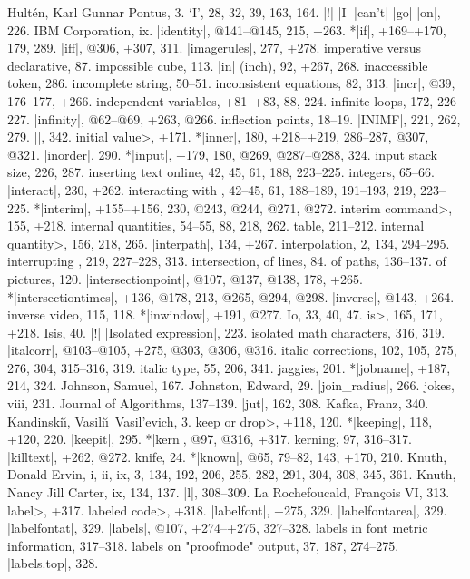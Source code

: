 Hult\'en, Karl Gunnar Pontus, 3.
\newletter
`I', 28, 32, 39, 163, 164.
|!| |I| |can't| |go| |on|, 226.
IBM Corporation, ix.
|identity|, @141--@145, 215, +263.
*|if|, +169--+170, 179, 289.
|iff|, @306, +307, 311.
|imagerules|, 277, +278.
imperative versus declarative, 87.
impossible cube, 113.
|in| (inch), 92, +267, 268.
inaccessible token, 286.
incomplete string, 50--51.
inconsistent equations, 82, 313.
|incr|, @39, 176--177, +266.
independent variables, +81--+83, 88, 224.
infinite loops, 172, 226--227.
|infinity|, @62--@69, +263, @266.
inflection points, 18--19.
|INIMF|, 221, 262, 279.
|\init|, 342.
\<initial value>, +171.
*|inner|, 180, +218--+219, 286--287, @307, @321.
|inorder|, 290.
*|input|, +179, 180, @269, @287--@288, 324.
input stack size, 226, 287.
inserting text online, 42, 45, 61, 188, 223--225.
integers, 65--66.
|interact|, 230, +262.
interacting with \MF, 42--45, 61, 188--189, 191--193, 219, 223--225.
*|interim|, +155--+156, 230, @243, @244, @271, @272.
\<interim command>, 155, +218.
internal quantities, 54--55, 88, 218, 262.
\sub table, 211--212.
\<internal quantity>, 156, 218, 265.
|interpath|, 134, +267.
interpolation, 2, 134, 294--295.
interrupting \MF, 219, 227--228, 313.
intersection, of lines, 84.
\sub of paths, 136--137.
\sub of pictures, 120.
|intersectionpoint|, @107, @137, @138, 178, +265.
*|intersectiontimes|, +136, @178, 213, @265, @294, @298.
|inverse|, @143, +264.
inverse video, 115, 118.
*|inwindow|, +191, @277.
Io, 33, 40, 47.
\<is>, 165, 171, +218.
Isis, 40.
|!| |Isolated expression|, 223.
isolated math characters, 316, 319.
|italcorr|, @103--@105, +275, @303, @306, @316.
italic corrections, 102, 105, 275, 276, 304, 315--316, 319.
italic type, 55, 206, 341.
\newletter
jaggies, 201.
*|jobname|, +187, 214, 324.
Johnson, Samuel, 167.
Johnston, Edward, 29.
|join_radius|, 266.
jokes, viii, 231.
Journal of Algorithms, 137--139.
|jut|, 162, 308.
\newletter
Kafka, Franz, 340.
Kandinski\u\i, Vasili\u\i\ Vasil'evich, 3.
\<keep or drop>, +118, 120.
*|keeping|, 118, +120, 220.
|keepit|, 295.
*|kern|, @97, @316, +317.
kerning, 97, 316--317.
|killtext|, +262, @272.
knife, 24.
*|known|, @65, 79--82, 143, +170, 210.
Knuth, Donald Ervin, i, ii, ix, 3, 134, 192, 206, 255, 282, 291, 304, 308, 345,
 361.
Knuth, Nancy Jill Carter, ix, 134, 137.
\newletter
|l|, 308--309.
La Rochefoucald, Fran\c cois VI, 313.
\<label>, +317.
\<labeled code>, +318.
|labelfont|, +275, 329.
|labelfontarea|, 329.
|labelfontat|, 329.
|labels|, @107, +274--+275, 327--328.
labels in font metric information, 317--318.
labels on "proofmode" output, 37, 187, 274--275.
|labels.top|, 328.
